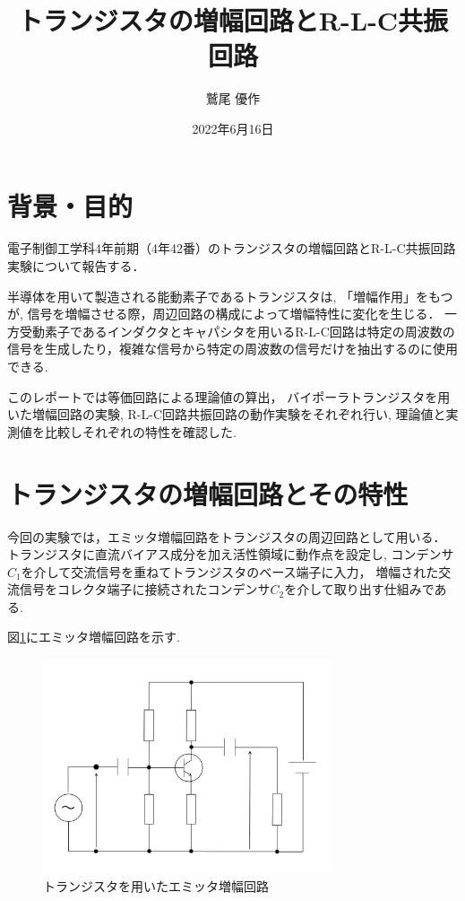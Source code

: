 \documentclass[dvipdfmx,titlepage,a4j]{jsarticle}  %
\title{トランジスタの増幅回路とR-L-C共振回路}
\author{鷲尾 優作}
\date{2022年6月16日}
\numberwithin{equation}{section}
\begin{document}
\pagestyle{foot}

\maketitle

\section{背景・目的}
電子制御工学科4年前期（4年42番）のトランジスタの増幅回路とR-L-C共振回路実験について報告する．

半導体を用いて製造される能動素子であるトランジスタは, 「増幅作用」をもつが, 信号を増幅させる際，周辺回路の構成によって増幅特性に変化を生じる．
一方受動素子であるインダクタとキャパシタを用いるR-L-C回路は特定の周波数の信号を生成したり，複雑な信号から特定の周波数の信号だけを抽出するのに使用できる.

このレポートでは等価回路による理論値の算出，
バイポーラトランジスタを用いた増幅回路の実験, R-L-C回路共振回路の動作実験をそれぞれ行い,
理論値と実測値を比較しそれぞれの特性を確認した.

\section{トランジスタの増幅回路とその特性}
今回の実験では，エミッタ増幅回路をトランジスタの周辺回路として用いる．
トランジスタに直流バイアス成分を加え活性領域に動作点を設定し,
コンデンサ$C_1$を介して交流信号を重ねてトランジスタのベース端子に入力，
増幅された交流信号をコレクタ端子に接続されたコンデンサ$C_2$を介して取り出す仕組みである.

図\ref{fig:fig1.jpg}にエミッタ増幅回路を示す.
\begin{figure}[H]
  \centering
  \includegraphics[width=8.5cm]{../fig/fig1.jpg}
  \caption{トランジスタを用いたエミッタ増幅回路}
  \label{fig:fig1.jpg}
\end{figure}
\end{document}
